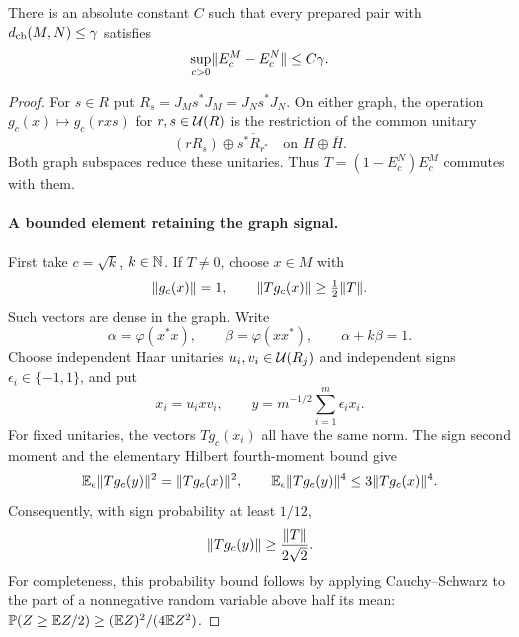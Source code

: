 \begin{proposition}
\label{prop:modular-graphs}
There is an absolute constant $C$ such that every prepared pair with
$d_{\mathrm{cb}}(M,N)\leq\gamma$ satisfies
\[
 \sup_{c>0}\lVert E_c^M-E_c^N\rVert\leq C\gamma.
\]
\end{proposition}

\begin{proof}
For $s\in R$ put $R_s=J_Ms^*J_M=J_Ns^*J_N$.  On either graph,
the operation $g_c(x)\mapsto g_c(rxs)$ for $r,s\in\mathcal U(R)$ is the
restriction of the common unitary
\[
 (rR_s)\oplus\overline{s^*R_{r^*}}
 \quad\text{on }H\oplus\overline H.
\]
Both graph subspaces reduce these unitaries.  Thus
$T=(1-E_c^N)E_c^M$ commutes with them.

\paragraph{A bounded element retaining the graph signal.}
First take $c=\sqrt{k}$, $k\in\mathbb N$.  If $T\ne0$, choose $x\in M$
with
\[
 \lVert g_c(x)\rVert=1,
 \qquad\lVert Tg_c(x)\rVert\geq\tfrac12\lVert T\rVert.
\]
Such vectors are dense in the graph.  Write
\[
 \alpha=\varphi(x^*x),\qquad\beta=\varphi(xx^*),
 \qquad\alpha+k\beta=1.
\]
Choose independent Haar unitaries $u_i,v_i\in\mathcal U(R_j)$ and independent
signs $\epsilon_i\in\{-1,1\}$, and put
\[
 x_i=u_ixv_i,\qquad y=m^{-1/2}\sum_{i=1}^m\epsilon_ix_i.
\]
For fixed unitaries, the vectors $Tg_c(x_i)$ all have the same norm.
The sign second moment and the elementary Hilbert fourth-moment bound
give
\[
 \mathbb E_\epsilon\lVert Tg_c(y)\rVert^2=\lVert Tg_c(x)\rVert^2,
 \qquad
 \mathbb E_\epsilon\lVert Tg_c(y)\rVert^4\leq3\lVert Tg_c(x)\rVert^4.
\]
Consequently, with sign probability at least $1/12$,
\begin{equation}
 \lVert Tg_c(y)\rVert\geq\frac{\lVert T\rVert}{2\sqrt2}.
 \label{eq:graph-sign-signal}
\end{equation}
For completeness, this probability bound follows by applying
Cauchy--Schwarz to the part of a nonnegative random variable above half
its mean: $\mathbb P(Z\geq\mathbb E Z/2)\geq(\mathbb E Z)^2/(4\mathbb E Z^2)$.


\end{proof}
